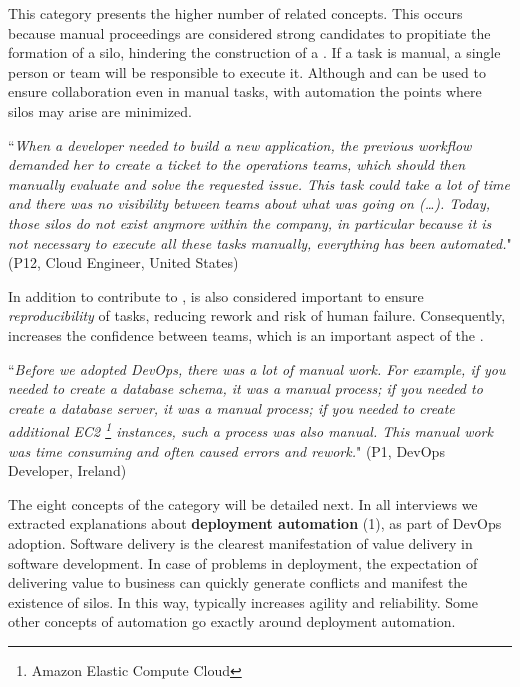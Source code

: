 This category presents the higher number of related concepts. This
occurs because manual proceedings are considered strong candidates to
propitiate the formation of a silo, hindering the construction
of a . If a task is manual, a single person or 
team will be responsible to execute it. Although  and  can
be used to ensure collaboration even in manual tasks, with automation the
points where silos may arise are minimized.

\begin{mq}
``\emph{When a developer needed to build a new application, the previous workflow demanded her
to create a ticket to the operations teams, which should then manually evaluate and solve
the requested issue. This task could take a lot of time and there was no
visibility between teams about what was going on (\ldots). Today, those silos do not exist
anymore within the company, in particular because it is not necessary to execute all these tasks manually,
everything has been automated.}" (P12, Cloud Engineer, United States)
\end{mq}

In addition to contribute to ,  is also considered
important to ensure \emph{reproducibility} of tasks, reducing rework and risk of
human failure. Consequently,  increases the confidence
between teams, which is an important aspect of the .

\begin{mq}
``\emph{Before we adopted DevOps, there was a lot of manual work. For example, if you
needed to create a database schema, it was a manual process; if you needed to create a
database server, it was a manual process; if you needed to create additional EC2 \footnote{Amazon Elastic 
Compute Cloud} instances, such a process was also manual. 
This manual work was time consuming and often caused errors and
rework.}" (P1, DevOps Developer, Ireland)
\end{mq}


The eight concepts of the  category will be detailed next.
In all interviews we extracted explanations about \textbf{deployment
automation} (1), as part of DevOps adoption. Software delivery is the clearest
manifestation of value delivery in software development. In case of problems
in deployment, the expectation of delivering value to business can quickly
generate conflicts and manifest the existence of silos. 
In this way,  typically increases agility and reliability. Some other
concepts of automation go exactly around deployment automation.

